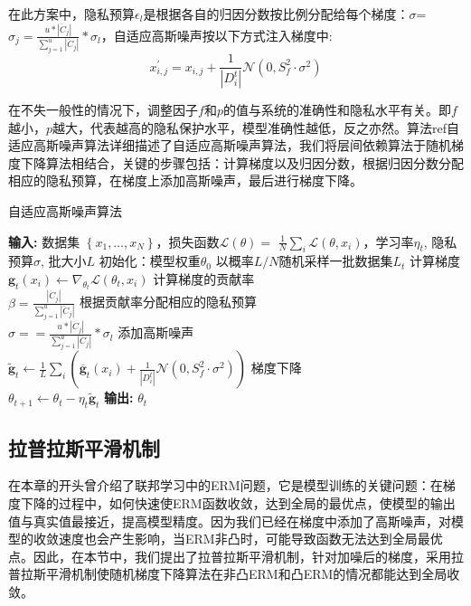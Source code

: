 在此方案中，隐私预算$\epsilon_{l}$是根据各自的归因分数按比例分配给每个梯度：$\sigma$=$\sigma_{j}=\frac{u *\left|\ddot{C}_{j}\right|}{\sum_{j=1}^{u}\left|\ddot{C}_{j}\right|} * \sigma_{l}$，自适应高斯噪声按以下方式注入梯度中:
\begin{equation}\label{eq:神经网络加噪3}
x_{i, j}^{\prime}=x_{i, j}+\frac{1}{\left|D_{i}^{t}\right|}\mathcal{N}\left(0, S_{f}^{2} \cdot \sigma^{2}\right)
\end{equation}

在不失一般性的情况下，调整因子$f$和$p$的值与系统的准确性和隐私水平有关。即$f$越小，$p$越大，代表越高的隐私保护水平，模型准确性越低，反之亦然。算法ref{自适应高斯噪声算法}详细描述了自适应高斯噪声算法，我们将层间依赖算法于随机梯度下降算法相结合，关键的步骤包括：计算梯度以及归因分数，根据归因分数分配相应的隐私预算，在梯度上添加高斯噪声，最后进行梯度下降。

\begin{algorithm}[!htb]
	\caption{自适应高斯噪声算法}
	\label{自适应高斯噪声算法}
	\begin{algorithmic}[1]
		\footnotesize
		\STATE \textbf{输入:} 数据集 $\left\{x_{1}, \ldots, x_{N}\right\}$，损失函数$\mathcal{L}(\theta)=$ $\frac{1}{N} \sum_{i} \mathcal{L}\left(\theta, x_{i}\right)$，学习率$\eta_{t}$, 隐私预算$\sigma$, 批大小$L$
		\STATE 初始化：模型权重$\theta_{0}$
			\STATE 以概率$L / N$随机采样一批数据集$L_{t}$
			\STATE 计算梯度\\$\mathbf{g}_{t}\left(x_{i}\right) \leftarrow \nabla_{\theta_{t}} \mathcal{L}\left(\theta_{t}, x_{i}\right)$
			\STATE 计算梯度的贡献率\\$\beta=\frac{\left|\ddot{C}_{j}\right|}{\sum_{j=1}^{u}\left|\ddot{C}_{j}\right|}$
			\STATE 根据贡献率分配相应的隐私预算\\$\sigma==\frac{u *\left|\ddot{C}_{j}\right|}{\sum_{j=1}^{u}\left|\ddot{C}_{j}\right|} * \sigma_{l}$
			\STATE 添加高斯噪声\\$\tilde{\mathbf{g}}_{t} \leftarrow \frac{1}{L} \sum_{i}\left(\overline{\mathbf{g}}_{t}\left(x_{i}\right)+\frac{1}{\left|D_{i}^{t}\right|}\mathcal{N}\left(0, S_{f}^{2} \cdot \sigma^{2}\right)\right)$
			\STATE 梯度下降\\$\theta_{t+1} \leftarrow \theta_{t}-\eta_{t} \tilde{\mathbf{g}}_{t}$
		\ENDFOR
		\STATE \textbf{输出:} $\theta_{t}$
	\end{algorithmic}
\end{algorithm}

\subsection{拉普拉斯平滑机制}
在本章的开头曾介绍了联邦学习中的ERM问题，它是模型训练的关键问题：在梯度下降的过程中，如何快速使ERM函数收敛，达到全局的最优点，使模型的输出值与真实值最接近，提高模型精度。因为我们已经在梯度中添加了高斯噪声，对模型的收敛速度也会产生影响，当ERM非凸时，可能导致函数无法达到全局最优点。因此，在本节中，我们提出了拉普拉斯平滑机制，针对加噪后的梯度，采用拉普拉斯平滑机制使随机梯度下降算法在非凸ERM和凸ERM的情况都能达到全局收敛。



